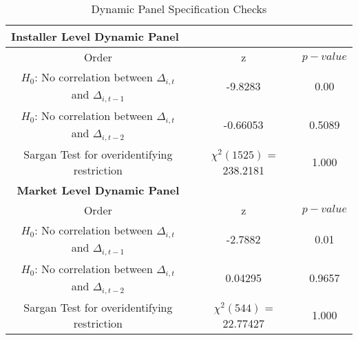 \begin{table}[H]
\centering
\begin{tabular}{@{}ccc@{}}
\toprule
\multicolumn{1}{l}{\textbf{Installer Level Dynamic Panel}} & \multicolumn{1}{l}{} & \multicolumn{1}{l}{} \\ \midrule
Order                                   & z                    & $p-value$  \\
$H_{0}$: No correlation between $\Delta_{i,t}$ and $\Delta_{i,t-1}$ & -9.8283  & 0.00 \\
$H_{0}$: No correlation between $\Delta_{i,t}$ and $\Delta_{i,t-2}$  & -0.66053 & 0.5089 \\
 Sargan Test for overidentifying restriction & $\chi^2(1525)$  =  238.2181& 1.000 \\ \midrule
\textbf{Market Level Dynamic Panel}          &    &      \\ \midrule
Order                           & z      & $p-value$  \\
$H_{0}$: No correlation between $\Delta_{i,t}$ and $\Delta_{i,t-1}$  & -2.7882 & 0.01 \\
$H_{0}$: No correlation between $\Delta_{i,t}$ and $\Delta_{i,t-2}$  & 0.04295  & 0.9657 \\
 Sargan Test for overidentifying restriction & $\chi^2(544)$ =  22.77427 & 1.000 \\ \bottomrule
\end{tabular}
\caption{Dynamic Panel Specification Checks
}
\label{autocorrelation_test}
\end{table} 